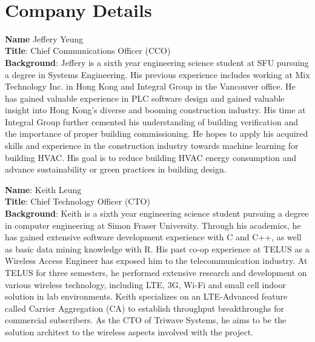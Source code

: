 

\setcounter{section}{5}
\
\section{Company Details}

\bigskip
\textbf{Name} Jeffery Yeung \\
\medskip
\textbf{Title}: Chief Communications Officer (CCO)\\
\medskip
\textbf{Background}:
Jeffery is a sixth year engineering science student at SFU pursuing a degree in Systems Engineering. His previous experience includes 
working at Mix Technology Inc. in Hong Kong and Integral Group in the Vancouver office. He has gained valuable experience in PLC software
design and gained valuable insight into Hong Kong's diverse and booming construction industry. His time at Integral Group further cemented
his understanding of building verification and the importance of proper building commissioning. He hopes to apply his acquired skills and experience
in the construction industry towards machine learning for building HVAC. His goal is to reduce building HVAC energy consumption and 
advance sustainability or green practices in building design.

\bigskip
\bigskip
\textbf{Name}:  Keith Leung\\
\medskip
\textbf{Title}: Chief Technology Officer (CTO) \\
\medskip
\textbf{Background}:
Keith is a sixth year engineering science student pursuing a degree in computer engineering at Simon Fraser University. Through his academics, he has gained extensive software development experience with C and C++, as well as basic data mining knowledge with R. His past co-op experience at TELUS as a Wireless Access Engineer has exposed him to the telecommunication industry. At TELUS for three semesters, he performed extensive research and development on various wireless technology, including LTE, 3G, Wi-Fi and small cell indoor solution in lab environments. Keith specializes on an LTE-Advanced feature called Carrier Aggregation (CA) to establish throughput breakthroughs for commercial subscribers. As the CTO of Triwave Systems, he aims to be the solution architect to the wireless aspects involved with the project.


